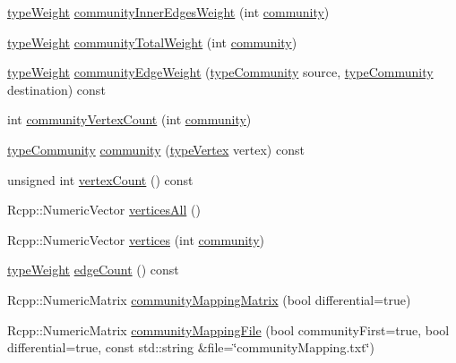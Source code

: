 \begin{DoxyCompactItemize}
\hyperlink{edge_8h_a2e7ea3be891ac8b52f749ec73fee6dd2}{type\+Weight} \hyperlink{classDynCommRcpp_aed6b4f1e844956429eb9a15d8d6df7b6}{community\+Inner\+Edges\+Weight} (int \hyperlink{classDynCommRcpp_ac3c8c1759d2ab106b757557e09834ec5}{community})
\item 
\hyperlink{edge_8h_a2e7ea3be891ac8b52f749ec73fee6dd2}{type\+Weight} \hyperlink{classDynCommRcpp_a687e7be3ae84f1a80a3648435bd473a3}{community\+Total\+Weight} (int \hyperlink{classDynCommRcpp_ac3c8c1759d2ab106b757557e09834ec5}{community})
\item 
\hyperlink{edge_8h_a2e7ea3be891ac8b52f749ec73fee6dd2}{type\+Weight} \hyperlink{classDynCommRcpp_ad74a2abe244e62d9df2b98aeea0d3155}{community\+Edge\+Weight} (\hyperlink{graphUndirectedGroupable_8h_a914da95c9ea7f14f4b7f875c36818556}{type\+Community} source, \hyperlink{graphUndirectedGroupable_8h_a914da95c9ea7f14f4b7f875c36818556}{type\+Community} destination) const
\item 
int \hyperlink{classDynCommRcpp_ab856335d737d2292df6f86e9cf199d58}{community\+Vertex\+Count} (int \hyperlink{classDynCommRcpp_ac3c8c1759d2ab106b757557e09834ec5}{community})
\item 
\hyperlink{graphUndirectedGroupable_8h_a914da95c9ea7f14f4b7f875c36818556}{type\+Community} \hyperlink{classDynCommRcpp_ac3c8c1759d2ab106b757557e09834ec5}{community} (\hyperlink{edge_8h_a5fbd20c46956d479cb10afc9855223f6}{type\+Vertex} vertex) const
\item 
unsigned int \hyperlink{classDynCommRcpp_af7bc0e9dc9a2c1e232b3e28b63388629}{vertex\+Count} () const
\item 
Rcpp\+::\+Numeric\+Vector \hyperlink{classDynCommRcpp_aa2aa3fe8c7af4239bd9b3c6a669329ec}{vertices\+All} ()
\item 
Rcpp\+::\+Numeric\+Vector \hyperlink{classDynCommRcpp_ad849d8e27c9f8aec2f6cdf89b06b9be4}{vertices} (int \hyperlink{classDynCommRcpp_ac3c8c1759d2ab106b757557e09834ec5}{community})
\item 
\hyperlink{edge_8h_a2e7ea3be891ac8b52f749ec73fee6dd2}{type\+Weight} \hyperlink{classDynCommRcpp_aaa83772d4e3bc2407991116a196f3ce0}{edge\+Count} () const
\item 
Rcpp\+::\+Numeric\+Matrix \hyperlink{classDynCommRcpp_aaa996ab5e558887d3bc5394af78a2e95}{community\+Mapping\+Matrix} (bool differential=true)
\item 
Rcpp\+::\+Numeric\+Matrix \hyperlink{classDynCommRcpp_a132aff4ca6f76fd006b2faccbfd01e04}{community\+Mapping\+File} (bool community\+First=true, bool differential=true, const std\+::string \&file=\char`\"{}community\+Mapping.\+txt\char`\"{})

\end{DoxyCompactItemize}
